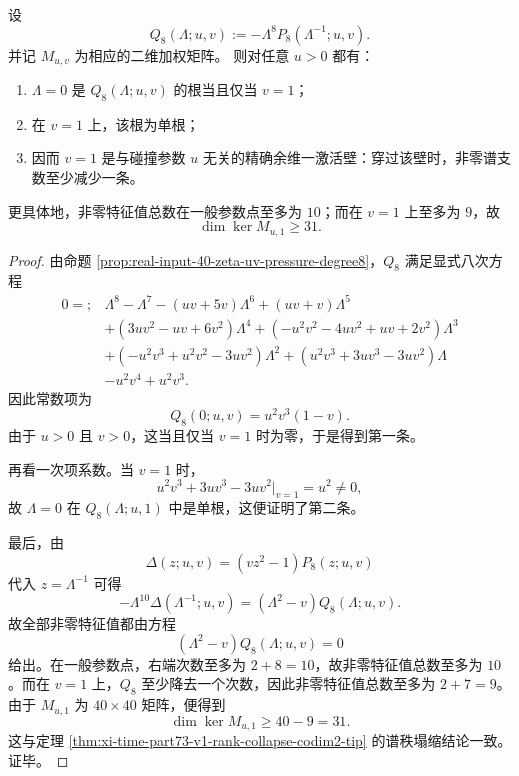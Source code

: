 \begin{theorem}[二维压力面的普适激活壁]\label{thm:conclusion-realinput40-uv-universal-activation-wall}
设
\[
Q_8(\Lambda;u,v):=-\Lambda^8 P_8(\Lambda^{-1};u,v).
\]
并记 \(M_{u,v}\) 为相应的二维加权矩阵。
则对任意 \(u>0\) 都有：
\begin{enumerate}
  \item \(\Lambda=0\) 是 \(Q_8(\Lambda;u,v)\) 的根当且仅当 \(v=1\)；
  \item 在 \(v=1\) 上，该根为单根；
  \item 因而 \(v=1\) 是与碰撞参数 \(u\) 无关的精确余维一激活壁：穿过该壁时，非零谱支数至少减少一条。
\end{enumerate}
更具体地，非零特征值总数在一般参数点至多为 \(10\)；而在 \(v=1\) 上至多为 \(9\)，故
\[
\dim\ker M_{u,1}\ge 31.
\]
\end{theorem}
\begin{proof}
由命题 \ref{prop:real-input-40-zeta-uv-pressure-degree8}，\(Q_8\) 满足显式八次方程
\[
\begin{aligned}
0=;&\Lambda^8-\Lambda^7-(uv+5v)\Lambda^6+(uv+v)\Lambda^5\\
&+(3uv^2-uv+6v^2)\Lambda^4+(-u^2v^2-4uv^2+uv+2v^2)\Lambda^3\\
&+(-u^2v^3+u^2v^2-3uv^2)\Lambda^2+(u^2v^3+3uv^3-3uv^2)\Lambda\\
&-u^2v^4+u^2v^3.
\end{aligned}
\]
因此常数项为
\[
Q_8(0;u,v)=u^2v^3(1-v).
\]
由于 \(u>0\) 且 \(v>0\)，这当且仅当 \(v=1\) 时为零，于是得到第一条。

再看一次项系数。当 \(v=1\) 时，
\[
u^2v^3+3uv^3-3uv^2\big|_{v=1}=u^2\neq 0,
\]
故 \(\Lambda=0\) 在 \(Q_8(\Lambda;u,1)\) 中是单根，这便证明了第二条。

最后，由
\[
\Delta(z;u,v)=(vz^2-1)P_8(z;u,v)
\]
代入 \(z=\Lambda^{-1}\) 可得
\[
-\Lambda^{10}\Delta(\Lambda^{-1};u,v)=(\Lambda^2-v)Q_8(\Lambda;u,v).
\]
故全部非零特征值都由方程
\[
(\Lambda^2-v)Q_8(\Lambda;u,v)=0
\]
给出。在一般参数点，右端次数至多为 \(2+8=10\)，故非零特征值总数至多为 \(10\)。而在 \(v=1\) 上，\(Q_8\) 至少降去一个次数，因此非零特征值总数至多为 \(2+7=9\)。由于 \(M_{u,1}\) 为 \(40\times 40\) 矩阵，便得到
\[
\dim\ker M_{u,1}\ge 40-9=31.
\]
这与定理 \ref{thm:xi-time-part73-v1-rank-collapse-codim2-tip} 的谱秩塌缩结论一致。证毕。
\end{proof}


